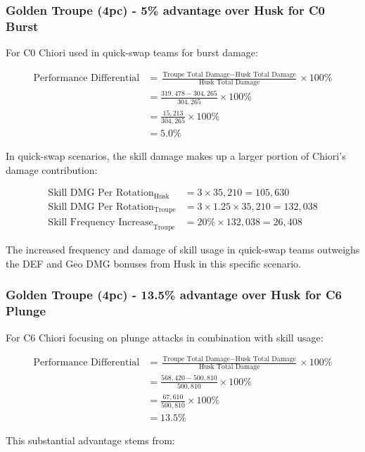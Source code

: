 \documentclass[12pt,a4paper]{article}
\begin{document}
\subsubsection{Golden Troupe (4pc) - 5\% advantage over Husk for C0 Burst}

For C0 Chiori used in quick-swap teams for burst damage:

\begin{align}
\text{Performance Differential} &= \frac{\text{Troupe Total Damage} - \text{Husk Total Damage}}{\text{Husk Total Damage}} \times 100\% \\
&= \frac{319,478 - 304,265}{304,265} \times 100\% \\
&= \frac{15,213}{304,265} \times 100\% \\
&= 5.0\%
\end{align}

In quick-swap scenarios, the skill damage makes up a larger portion of Chiori's damage contribution:

\begin{align}
\text{Skill DMG Per Rotation}_{\text{Husk}} &= 3 \times 35,210 = 105,630 \\
\text{Skill DMG Per Rotation}_{\text{Troupe}} &= 3 \times 1.25 \times 35,210 = 132,038 \\
\text{Skill Frequency Increase}_{\text{Troupe}} &= 20\% \times 132,038 = 26,408
\end{align}

The increased frequency and damage of skill usage in quick-swap teams outweighs the DEF and Geo DMG bonuses from Husk in this specific scenario.

\subsubsection{Golden Troupe (4pc) - 13.5\% advantage over Husk for C6 Plunge}

For C6 Chiori focusing on plunge attacks in combination with skill usage:

\begin{align}
\text{Performance Differential} &= \frac{\text{Troupe Total Damage} - \text{Husk Total Damage}}{\text{Husk Total Damage}} \times 100\% \\
&= \frac{568,420 - 500,810}{500,810} \times 100\% \\
&= \frac{67,610}{500,810} \times 100\% \\
&= 13.5\%
\end{align}

This substantial advantage stems from:
\end{document}
